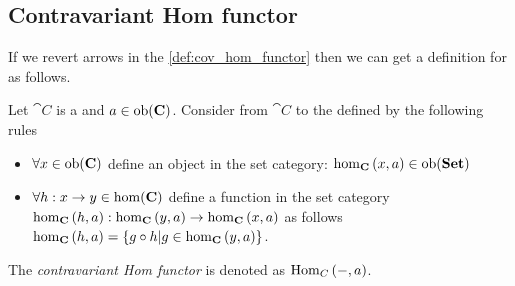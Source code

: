 \subsection{Contravariant Hom functor}
If we revert arrows in the \cref{def:cov_hom_functor} then we can get
a definition for  as follows.
\begin{definition}
\label{def:con_hom_functor}
Let $\cat{C}$ is a  and $a \in
\mathrm{ob}(\mathbf{C})$. Consider  from $\cat{C}$ to the
 defined by the following rules
\begin{itemize}
\item $\forall x \in \mathrm{ob}(\mathbf{C})$ define an object in the set category:
  $\catmset[C]{x}{a} \in \catob{Set}$ 
\item $\forall h: x \to y \in \mathrm{hom}(\mathbf{C})$ define a function in the set category
  $\catmset[C]{h}{a}: \catmset[C]{y}{a} \to \catmset[C]{x}{a}$ as follows
  $\catmset[C]{h}{a} = \{g \circ h | g \in \catmset[C]{y}{a}\}$.
\end{itemize}  
The \textit{contravariant Hom functor} is denoted as $\mathrm{Hom}_{C}\left(-, a\right)$.
\end{definition}

